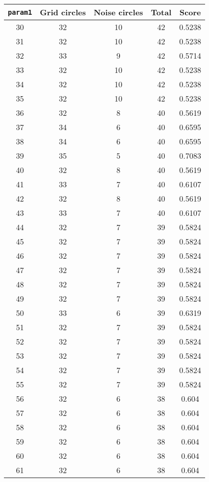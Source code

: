 \documentclass[letterpaper, 12pt]{article}
\begin{document}
\begin{longtable}{|c|c|c|c|c|}
\hline
\textbf{\texttt{param1}} & \textbf{Grid circles} & \textbf{Noise circles} & \textbf{Total} & \textbf{Score} \\
\hline
30 & 32 & 10 & 42 & 0.5238 \\
\hline
31 & 32 & 10 & 42 & 0.5238 \\
\hline
32 & 33 & 9 & 42 & 0.5714 \\
\hline
33 & 32 & 10 & 42 & 0.5238 \\
\hline
34 & 32 & 10 & 42 & 0.5238 \\
\hline
35 & 32 & 10 & 42 & 0.5238 \\
\hline
36 & 32 & 8 & 40 & 0.5619 \\
\hline
37 & 34 & 6 & 40 & 0.6595 \\
\hline
38 & 34 & 6 & 40 & 0.6595 \\
\hline
39 & 35 & 5 & 40 & 0.7083 \\
\hline
40 & 32 & 8 & 40 & 0.5619 \\
\hline
41 & 33 & 7 & 40 & 0.6107 \\
\hline
42 & 32 & 8 & 40 & 0.5619 \\
\hline
43 & 33 & 7 & 40 & 0.6107 \\
\hline
44 & 32 & 7 & 39 & 0.5824 \\
\hline
45 & 32 & 7 & 39 & 0.5824 \\
\hline
46 & 32 & 7 & 39 & 0.5824 \\
\hline
47 & 32 & 7 & 39 & 0.5824 \\
\hline
48 & 32 & 7 & 39 & 0.5824 \\
\hline
49 & 32 & 7 & 39 & 0.5824 \\
\hline
50 & 33 & 6 & 39 & 0.6319 \\
\hline
51 & 32 & 7 & 39 & 0.5824 \\
\hline
52 & 32 & 7 & 39 & 0.5824 \\
\hline
53 & 32 & 7 & 39 & 0.5824 \\
\hline
54 & 32 & 7 & 39 & 0.5824 \\
\hline
55 & 32 & 7 & 39 & 0.5824 \\
\hline
56 & 32 & 6 & 38 & 0.604 \\
\hline
57 & 32 & 6 & 38 & 0.604 \\
\hline
58 & 32 & 6 & 38 & 0.604 \\
\hline
59 & 32 & 6 & 38 & 0.604 \\
\hline
60 & 32 & 6 & 38 & 0.604 \\
\hline
61 & 32 & 6 & 38 & 0.604 \\

\end{longtable}
\end{document}
